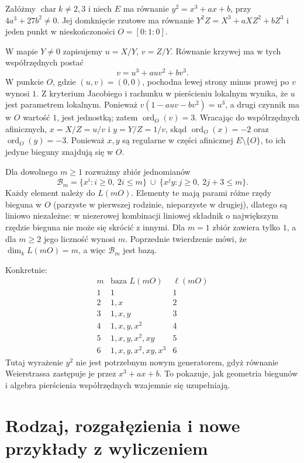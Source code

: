 \begin{przyklad}
\label{prz:weierstrass-LmO}
Załóżmy $\operatorname{char}k\ne2,3$ i niech $E$ ma równanie
$y^2=x^3+ax+b$, przy $4a^3+27b^2\ne0$.
Jej domknięcie rzutowe ma równanie
$Y^2Z=X^3+aXZ^2+bZ^3$ i jeden punkt
w nieskończoności $O=[0:1:0]$.

W mapie $Y\ne0$ zapisujemy $u=X/Y$, $v=Z/Y$.
Równanie krzywej ma w tych współrzędnych postać
\[
 v=u^3+auv^2+bv^3.
\]
W punkcie $O$, gdzie $(u,v)=(0,0)$,
pochodna lewej strony minus prawej po $v$
wynosi $1$. Z kryterium Jacobiego i rachunku
w pierścieniu lokalnym wynika, że $u$ jest
parametrem lokalnym. Ponieważ
$v(1-auv-bv^2)=u^3$, a drugi czynnik ma w $O$
wartość $1$, jest jednostką; zatem
$\operatorname{ord}_O(v)=3$.
Wracając do współrzędnych afinicznych,
$x=X/Z=u/v$ i $y=Y/Z=1/v$, skąd
$\operatorname{ord}_O(x)=-2$ oraz
$\operatorname{ord}_O(y)=-3$.
Ponieważ $x,y$ są regularne w części afinicznej $E\setminus\{O\}$,
to ich jedyne bieguny znajdują się w $O$.

Dla dowolnego $m\ge1$ rozważmy zbiór jednomianów
\[
 \mathcal B_m=
 \{x^i: i\ge0,\ 2i\le m\}\ \cup\
 \{x^j y:j\ge0,\ 2j+3\le m\}.
\]
Każdy element należy do $L(mO)$. Elementy te mają
parami różne rzędy bieguna w $O$ (parzyste w pierwszej
rodzinie, nieparzyste w drugiej), dlatego są liniowo
niezależne: w niezerowej kombinacji liniowej składnik
o największym rzędzie bieguna nie może się skrócić z innymi.
Dla $m=1$ zbiór zawiera tylko $1$, a dla $m\ge2$
jego liczność wynosi $m$. Poprzednie twierdzenie mówi,
że $\dim_kL(mO)=m$, a więc $\mathcal B_m$ jest bazą.

Konkretnie:
\[
\begin{array}{c|l|c}
 m & \text{baza }L(mO) & \ell(mO)\\ \hline
 1 & 1 & 1\\
 2 & 1,x & 2\\
 3 & 1,x,y & 3\\
 4 & 1,x,y,x^2 & 4\\
 5 & 1,x,y,x^2,xy & 5\\
 6 & 1,x,y,x^2,xy,x^3 & 6
\end{array}
\]
Tutaj wyrażenie $y^2$ nie jest potrzebnym nowym generatorem,
gdyż równanie Weierstrassa zastępuje je przez $x^3+ax+b$.
To pokazuje, jak geometria biegunów i algebra pierścienia
współrzędnych wzajemnie się uzupełniają.
\end{przyklad}

\section{Rodzaj, rozgałęzienia i nowe przykłady z wyliczeniem}
\label{sec:ramification-examples}


